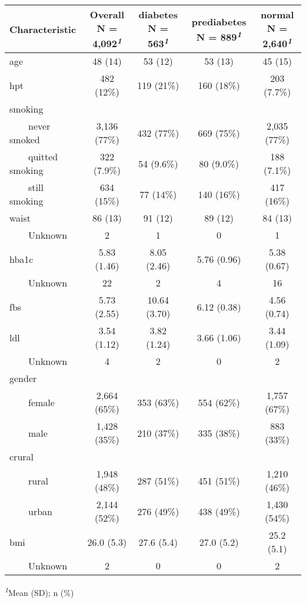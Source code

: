 \documentclass[
  letterpaper,
  DIV=11,
  numbers=noendperiod]{scrartcl}
\begin{document}
\begin{table}
\fontsize{12.0pt}{14.4pt}\selectfont
\begin{tabular*}{\linewidth}{@{\extracolsep{\fill}}lcccc}
\toprule
\textbf{Characteristic} & \textbf{Overall}  N = 4,092\textsuperscript{\textit{1}} & \textbf{diabetes}  N = 563\textsuperscript{\textit{1}} & \textbf{prediabetes}  N = 889\textsuperscript{\textit{1}} & \textbf{normal}  N = 2,640\textsuperscript{\textit{1}} \\ 
\midrule\addlinespace[2.5pt]
age & 48 (14) & 53 (12) & 53 (13) & 45 (15) \\ 
hpt & 482 (12\%) & 119 (21\%) & 160 (18\%) & 203 (7.7\%) \\ 
smoking &  &  &  &  \\ 
    never smoked & 3,136 (77\%) & 432 (77\%) & 669 (75\%) & 2,035 (77\%) \\ 
    quitted smoking & 322 (7.9\%) & 54 (9.6\%) & 80 (9.0\%) & 188 (7.1\%) \\ 
    still smoking & 634 (15\%) & 77 (14\%) & 140 (16\%) & 417 (16\%) \\ 
waist & 86 (13) & 91 (12) & 89 (12) & 84 (13) \\ 
    Unknown & 2 & 1 & 0 & 1 \\ 
hba1c & 5.83 (1.46) & 8.05 (2.46) & 5.76 (0.96) & 5.38 (0.67) \\ 
    Unknown & 22 & 2 & 4 & 16 \\ 
fbs & 5.73 (2.55) & 10.64 (3.70) & 6.12 (0.38) & 4.56 (0.74) \\ 
ldl & 3.54 (1.12) & 3.82 (1.24) & 3.66 (1.06) & 3.44 (1.09) \\ 
    Unknown & 4 & 2 & 0 & 2 \\ 
gender &  &  &  &  \\ 
    female & 2,664 (65\%) & 353 (63\%) & 554 (62\%) & 1,757 (67\%) \\ 
    male & 1,428 (35\%) & 210 (37\%) & 335 (38\%) & 883 (33\%) \\ 
crural &  &  &  &  \\ 
    rural & 1,948 (48\%) & 287 (51\%) & 451 (51\%) & 1,210 (46\%) \\ 
    urban & 2,144 (52\%) & 276 (49\%) & 438 (49\%) & 1,430 (54\%) \\ 
bmi & 26.0 (5.3) & 27.6 (5.4) & 27.0 (5.2) & 25.2 (5.1) \\ 
    Unknown & 2 & 0 & 0 & 2 \\ 
\bottomrule
\end{tabular*}
\begin{minipage}{\linewidth}
\textsuperscript{\textit{1}}Mean (SD); n (\%)\\
\end{minipage}
\end{table}
\end{document}
